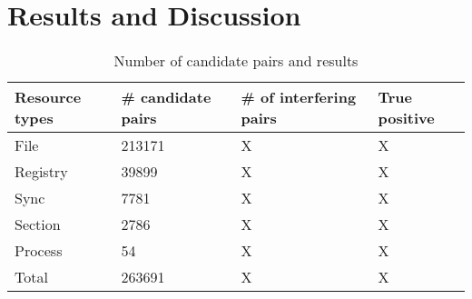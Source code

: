\chapter{Results and Discussion}
\label{cha:Results and Discussion}
\begin{table}[htsb]
  \caption[]{Number of candidate pairs and results }\label{tab:routers}
  \centering
  \begin{tabular}{l l l l}
    \toprule
    Resource types & \# candidate pairs& \# of interfering pairs & True positive \\
    \midrule
    File & 213171 & X & X \\
    Registry & 39899 & X & X \\
    Sync & 7781 & X & X \\
    Section & 2786 & X & X \\
    Process & 54 & X & X \\
    \bottomrule
    Total & 263691 & X & X \\
  \end{tabular}
\end{table}
